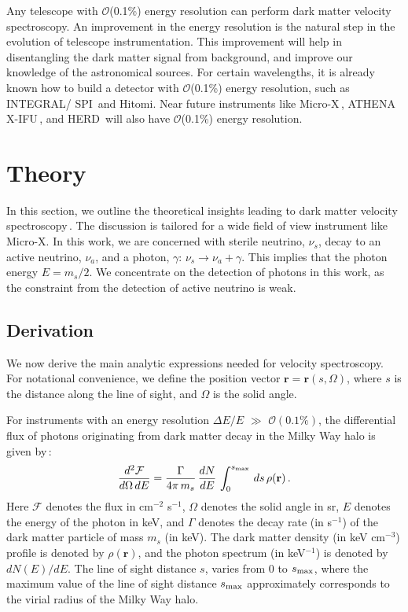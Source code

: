 \documentclass[aps,prd,10pt,twocolumn,superscriptaddress,showpacs]{revtex4-1}
\newcommand{\br}[0]{\mathbf{r}}
\begin{document}
Any telescope with $\mathcal{O}$(0.1\%) energy resolution can perform dark matter velocity spectroscopy.  An improvement in the energy resolution is the natural step in the evolution of telescope instrumentation.  This improvement will help in disentangling the dark matter signal from background, and improve our knowledge of the astronomical sources.  For certain wavelengths, it is already known how to build a detector with $\mathcal{O}$(0.1\%) energy resolution, such as INTEGRAL/ SPI\,\cite{2003AA} and Hitomi.  Near future instruments like Micro-X\,\cite{Figueroa-Feliciano:2015gwa}, ATHENA X-IFU\,\cite{Barret:2016ett}, and HERD\,\cite{Wang:2015ema} will also have $\mathcal{O}$(0.1\%) energy resolution.


\section{Theory}
\label{sec:theory}

In this section, we outline the theoretical insights leading to dark matter velocity spectroscopy\,\cite{speckhard2016}.  
The discussion is tailored for a wide field of view instrument like Micro-X.  In this work, we are concerned with sterile neutrino, 
$\nu_s$, decay to an active neutrino, $\nu_a$, and a photon, $\gamma$: $\nu_s \rightarrow \nu_a + \gamma$.  
This implies that the photon energy $E = m_s/2$.  We concentrate on the detection of photons in this work, as the constraint from the detection of active neutrino is weak.

\subsection{Derivation}
\label{sec:derivation}

We now derive the main analytic expressions needed for velocity spectroscopy. For notational
convenience, we define the position vector $\br=\br(s, \Omega)$, where $s$ is the distance
along the line of sight, and $\Omega$ is the solid angle.

For instruments with an energy resolution $\Delta E/E$ $\gg$ $\mathcal{O} (0.1\%)$, the differential flux of photons originating from dark matter decay in the Milky Way halo is given by\,\cite{Figueroa-Feliciano:2015gwa}:
\begin{eqnarray}
\dfrac{d^2 \mathcal{F}}{d\Omega \, dE} =  \dfrac{\Gamma}{4\pi \, m_s} \, \dfrac{dN}{dE} \, \int
_0 ^{s_{\rm max}}  \, ds \, \rho(\br)  \,.
\label{eq:double differential for the flux}
\end{eqnarray}
Here $\mathcal{F}$ denotes the flux in cm$^{-2}$ s$^{-1}$, $\Omega$ denotes the solid angle in sr,
$E$ denotes the energy of the photon in keV, and $\Gamma$ denotes the decay rate (in s$^{-1}$) of
the dark matter particle of mass $m_s$ (in keV).  The dark matter density (in keV cm$^{-3}$) profile
is denoted by $\rho(\br)$, and the photon spectrum (in keV$^{-1}$) is denoted by $dN(E)/dE$.  The line of sight distance $s$, varies from 0 to $s_{\rm max}$, where the maximum value of the line of sight distance $s_{\rm max}$ approximately corresponds to the virial radius of the Milky Way halo.
\end{document}
